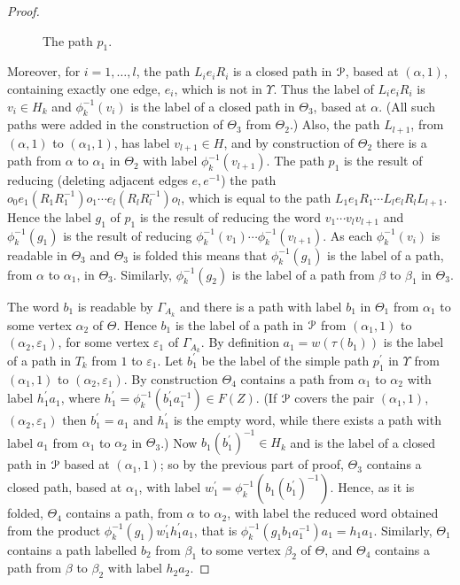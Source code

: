 \documentclass[a4paper,12pt]{article}
\renewcommand{\a}{\alpha }
\renewcommand{\b}{\beta }
\newcommand{\G}{\Gamma }
\newcommand{\e}{\varepsilon }
\newcommand{\T}{\Theta }
\renewcommand{\t}{\tau }
\newcommand{\U}{\Upsilon }
\newcommand{\cP}{{\cal{P}}}
\numberwithin{equation}{section}
\numberwithin{figure}{section}
\begin{document}
\begin{proof}
\begin{figure}
\begin{center}
\end{center}
\caption{The path $p_1$.}
\label{fig:LeR}
\end{figure}
Moreover, for $i=1,\ldots ,l$,
the path $L_i e_i R_i$ is a closed path in $\cP$, based
at $(\a,1)$, containing exactly one edge, $e_i$, which is not in $\U$.
Thus the label of  $L_i e_i R_i$ is $v_i\in H_k$ and $\phi_k^{-1}(v_i)$ is the
label of a closed path in $\T_3$, based at  $\a$. (All such paths
were added in the construction of $\T_3$ from $\T_2$.)
Also, the path $L_{l+1}$, from $(\a,1)$ to $(\a_1,1)$, has 
label $v_{l+1}\in H$, 
and by construction of $\T_2$ there is a path from $\a$ to
$\a_1$ in $\T_2$ with label $\phi_k^{-1}(v_{l+1})$.
The path
$p_1$ is the result of reducing (deleting adjacent edges $e,e^{-1}$) the path
$o_0 e_1 (R_1 R_1^{-1}) o_1 \cdots e_{l}(R_l R_l^{-1}) o_{l}$, which
is equal to the path $L_1 e_1 R_1 \cdots L_l e_l R_l L_{l+1}$. Hence the label $g_1$
of $p_1$ is the result of
reducing the word $v_1\cdots v_l v_{l+1}$
 and $\phi_k^{-1}(g_1)$ is the result of
reducing $\phi_k^{-1}(v_1) \cdots \phi_k^{-1}(v_{l+1})$. As each $\phi_k^{-1}(v_i)$ is readable
in $\T_3$ and $\T_3$ is folded this means  that $\phi_k^{-1}(g_1)$ is the
label of a path, from $\a$ to   $\a_1$, in $\T_3$. Similarly,
$\phi_k^{-1}(g_2)$
is the label of a path from $\b$ to $\b_1$ in $\T_3$.

The word $b_1$ is readable by $\G_{A_k}$ and there
is a path with label $b_1$ in $\T_1$ from $\a_1$ to some vertex $\a_2$ 
of $\T$.
Hence $b_1$ is the label of a path in $\cP$ from $(\a_1,1)$ to
$(\a_2,\e_1)$, for some vertex $\e_1$ of $\G_{A_k}$.
By definition $a_1=w(\t(b_1))$ is the label of a path in $T_k$ from $1$ to $\e_1$.
Let $b_1^\prime$
 be the label of the simple path $p_1^\prime$ in $\U$ from
$(\a_1,1)$ to $(\a_2,\e_1)$. By construction $\T_4$ contains a path
from $\a_1$ to $\a_2$ with label $h_1^\prime a_1$, where
$h_1^\prime =\phi_k^{-1}(b_1^\prime a_1^{-1})\in F(Z)$.
(If $\cP$ covers the pair $(\a_1,1)$, $(\a_2,\e_1)$ then
$b_1^\prime=a_1$ and $h_1^\prime$ is the empty word, while there 
exists a path with label $a_1$ from $\a_1$ to $\a_2$ in $\T_3$.)
Now $b_1(b_1^\prime)^{-1}\in H_k$ and is the label of a closed
path  in $\cP$ based at $(\a_1,1)$; so by the
previous part of proof, $\T_3$ contains a closed path, based at $\a_1$,
 with label
$w_1^\prime=\phi_k^{-1}(b_1(b_1^\prime)^{-1})$. Hence, as it is folded,
$\T_4$ contains a path, from $\a$ to $\a_2$,
with label the reduced word obtained from the product
$\phi_k^{-1}(g_1)w_1^{\prime} h_1^\prime a_1$, that is
 $\phi_k^{-1}(g_1b_1a_1^{-1}) a_1=h_1a_1$.
 Similarly, $\T_1$ contains a path labelled $b_2$ from $\b_1$ to
some vertex $\b_2$ of $\T$, and $\T_4$ contains a path from
$\b$ to $\b_2$ with label $h_2a_2$.


\end{proof}
\end{document}
